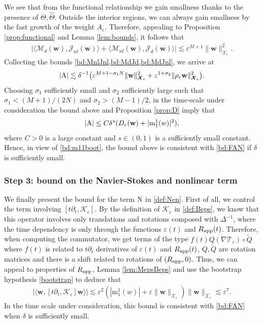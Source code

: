 \documentclass[11pt,reqno,a4paper]{amsart}
\def\eps{\varepsilon}
\def\de{{\partial}}
\newcommand{\cJ}{\mathcal{J}}
\newcommand{\cK}{\mathcal{K}}
\newcommand{\cM}{\mathcal{M}}
\newcommand{\cT}{\mathcal{T}}
\newcommand{\cX}{\mathcal{X}}
\newcommand{\mrm}{\mathrm{m}}
\newcommand{\1}{\mathbbm{1}}
\theoremstyle{definition}
\theoremstyle{definition}
\numberwithin{equation}{section}
\begin{document}
We see that from the functional relationship we gain smallness thanks to the presence of $\Theta,\widehat{\Theta}.$ 
Outside the interior regions, we can always gain smallness by the fast growth of the weight $A_\eps$. Therefore, appealing to Proposition \ref{prop:functional} and Lemma \ref{lem:bounds}, it follows that 
\begin{align}
\label{bd:MdJnl}
    \big|\langle \cM_{d}({\mathbf w}),\cJ_{nl}({\mathbf w})\rangle+\langle \cM_{nl}({\mathbf w}),\cJ_{d}({\mathbf w})\rangle\big|\lesssim \eps^{M+1} \|{\mathbf w}\|_{\boldsymbol{\cX}_\eps}^2.
\end{align}
Collecting the bounds \cref{bd:MnlJnl,bd:MdJd,bd:MdJnl}, we arrive at 
\begin{align}
    |{\rm A}|\lesssim \delta^{-1}\big(\eps^{M+1-\sigma_1N} \|{\mathbf w}\|_{\boldsymbol{\cX}_\eps}^2+\eps^{1+\sigma_2} \|\rho_\eps{\mathbf w}\|_{\boldsymbol{\cX}_\eps}^2\big).
\end{align}
Choosing $\sigma_1$ sufficiently small and $\sigma_2$ sufficiently large such that $\sigma_1<(M+1)/(2N)$ and $\sigma_2>(M-1)/2$, in the time-scale under consideration the bound above and Proposition  \ref{prop:D} imply that 
\begin{align}
    |{\rm A}|\leq C\delta^{s} (D_{\eps}({\mathbf w})+|\mrm_1^1(w)|^2),    
\end{align}
where $C>0$ is a large constant and $s\in (0,1)$ is a sufficiently small constant. Hence, in view of \cref{bd:m11boot}, the bound above is consistent with \cref{bd:FAN} if $\delta$ is sufficiently small.


\subsubsection*{\textbf{Step 3: bound on the Navier-Stokes and nonlinear term}}
We finally present the bound for the term ${\rm N}$ in \cref{def:Nen}. First of all, we control the term involving  $[t\de_t,\cK_\eps]$. By the definition of $\cK_\eps$ in \cref{def:Beps}, we know that this operator involves only translations and rotations composed with $\Delta^{-1}$, where the time dependency is only through the functions $\eps(t)$ and $R_{\rm app}(t)$. Therefore, when computing the commutator, we get terms of the type $f(t)Q(\nabla\cT_{\eps})\circ \tilde{Q}$ where $f(t)$ is related to $t\de_t$ derivatives of $\eps(t)$ and $R_{\rm app}(t)$, $Q,\tilde{Q}$ are rotation matrices and there is a shift related to rotations of $(R_{\rm app},0)$. Thus, we can appeal to properties of $R_{\rm app}$,  Lemma \ref{lem:MepsBeps} and use the bootstrap hypothesis \cref{bootstrap} to deduce that
\begin{align}
  |\langle{\mathbf w},[t\de_t,\cK_\eps]{\mathbf w}\rangle|\lesssim \eps^2(|\mrm^1_1(w)|+\eps\|{\mathbf w}\|_{\boldsymbol{\cX}_\eps})\|{\mathbf w}\|_{\boldsymbol{\cX}_\eps}\lesssim \eps^7.
\end{align} 
In the time scale under consideration, this bound is consistent with \cref{bd:FAN} when $\delta$ is sufficiently small.
\end{document}

